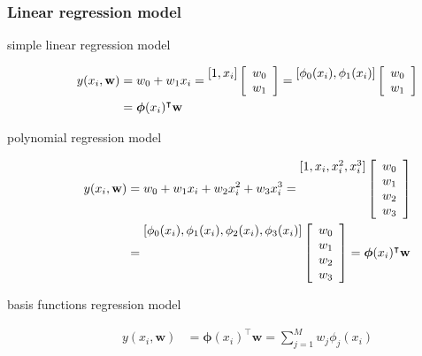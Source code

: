 \begin{frame}
    \frametitle{Linear regression model}

	\scriptsize
	\begin{description}
		\item[simple linear regression model]
			\begin{align*}
                y(x_i, \mathbf{w})&=w_0+w_1x_i
				                   =\raisebox{0.60em}{$[1,x_i]$}
									\left[\begin{array}{c}
								        w_0\\
								        w_1
								    \end{array}\right]
				                   =\raisebox{0.60em}{$[\phi_0(x_i),\phi_1(x_i)]$}
									\left[\begin{array}{c}
								        w_0\\
								        w_1
								    \end{array}\right]\\
                                  & =
									\boldsymbol{\phi}(x_i)^\intercal\mathbf{w}
			\end{align*}
		\item[polynomial regression model]
			\begin{align*}
				y(x_i, \mathbf{w})&=w_0+w_1x_i+w_2x_i^2+w_3x_i^3
				                   =\raisebox{1.80em}{$[1,x_i,x_i^2,x_i^3]$}
									\left[\begin{array}{c}
								        w_0\\
								        w_1\\
								        w_2\\
								        w_3
								    \end{array}\right]\\
				                  &=\raisebox{1.80em}{$[\phi_0(x_i),\phi_1(x_i),\phi_2(x_i),\phi_3(x_i)]$}
									\left[\begin{array}{c}
								        w_0\\
								        w_1\\
								        w_2\\
								        w_3
								    \end{array}\right]=
									\boldsymbol{\phi}(x_i)^\intercal\mathbf{w}
			\end{align*}
		\item[basis functions regression model]
			\begin{align*}
				y(x_i,
                \mathbf{w})&=\boldsymbol{\phi}(x_i)^\intercal\mathbf{w}=\sum_{j=1}^Mw_j\phi_j(x_i)
			\end{align*}
	\end{description}
	\normalsize
\end{frame}

